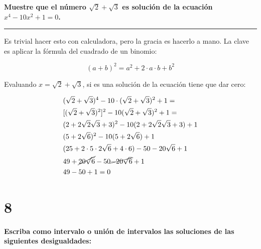 \documentclass{article}
\begin{document}
\textbf{Muestre que el número $\sqrt{2} + \sqrt{3}$ es solución de la ecuación \\ $  x^4 - 10 x^2 + 1 = 0$.}
\vspace{0.5em}
\hrule
\vspace{1em}
Es trivial hacer esto con calculadora, pero la gracia es hacerlo a mano. La clave es aplicar la fórmula del cuadrado de un binomio:

\begin{equation}
(a + b)^2 = a^2 + 2 \cdot a \cdot b + b^2
\end{equation}

Evaluando $x = \sqrt{2} + \sqrt{3}$, si es una solución de la ecuación tiene que dar cero:

\begin{subequations}
\begin{align}
& (\sqrt{2} + \sqrt{3})^4 - 10 \cdot (\sqrt{2} + \sqrt{3})^2 + 1 = \\
& [(\sqrt{2} + \sqrt{3})^2]^2 - 10 (\sqrt{2} + \sqrt{3})^2 + 1 = \\
& (2 + 2 \sqrt{2} \sqrt{3} + 3)^2 - 10 (2 + 2 \sqrt{2} \sqrt{3} + 3) + 1 \\
& (5 + 2 \sqrt{6})^2 - 10 (5 + 2 \sqrt{6}) + 1 \\
& (25 + 2 \cdot 5 \cdot 2 \sqrt{6} + 4 \cdot 6) - 50 -20 \sqrt{6} + 1 \\
& 49 + \cancel{20 \sqrt{6}} - 50 \cancel{-20 \sqrt{6}} + 1 \\
& 49 -50 + 1 = 0
\end{align}
\end{subequations}

\section*{8}
\label{sec:8}

\textbf{Escriba como intervalo o unión de intervalos las soluciones de las siguientes desigualdades:}
\end{document}
